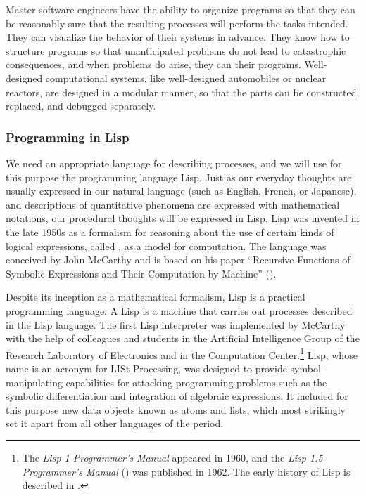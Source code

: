 Master software engineers have the ability to organize programs so that they
can be reasonably sure that the resulting processes will perform the tasks
intended. They can visualize the behavior of their systems in advance. They
know how to structure programs so that unanticipated problems do not lead to
catastrophic consequences, and when problems do arise, they can 
their programs. Well-designed computational systems, like well-designed
automobiles or nuclear reactors, are designed in a modular manner, so that the
parts can be constructed, replaced, and debugged separately.

\subsubsection*{Programming in Lisp}

We need an appropriate language for describing processes, and we will use for
this purpose the programming language Lisp. Just as our everyday thoughts are
usually expressed in our natural language (such as English, French, or
Japanese), and descriptions of quantitative phenomena are expressed with
mathematical notations, our procedural thoughts will be expressed in Lisp.
Lisp was invented in the late 1950s as a formalism for reasoning about the use
of certain kinds of logical expressions, called ,
as a model for computation. The language was conceived by John McCarthy and is
based on his paper ``Recursive Functions of Symbolic Expressions and Their
Computation by Machine'' ().

Despite its inception as a mathematical formalism, Lisp is a practical
programming language. A Lisp  is a machine that carries
out processes described in the Lisp language. The first Lisp interpreter was
implemented by McCarthy with the help of colleagues and students in the
Artificial Intelligence Group of the  Research Laboratory of
Electronics and in the  Computation Center.\footnote{The
\textit{Lisp 1 Programmer's Manual} appeared in 1960, and the \textit{Lisp 1.5
Programmer's Manual} () was published in 1962. The early history
of Lisp is described in .} Lisp, whose name is an acronym for
LISt Processing, was designed to provide symbol-manipulating capabilities for
attacking programming problems such as the symbolic differentiation and
integration of algebraic expressions. It included for this purpose new data
objects known as atoms and lists, which most strikingly set it apart from all
other languages of the period.


